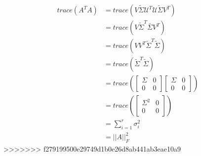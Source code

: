 \begin{align*}
trace(A^TA) &= trace(V\tilde{\Sigma}\mathcal{U}^T\mathcal{U}\tilde{\Sigma}V^T)\\
&= trace(V\tilde{\Sigma}^T\bar{\Sigma}V^T)\\
&= trace(VV^T\tilde{\Sigma}^T\tilde{\Sigma})\\
&= trace(\tilde{\Sigma}^T\tilde{\Sigma})\\
&= trace(
\begin{bmatrix}%
\Sigma & 0\\
0 & 0
\end{bmatrix}
\begin{bmatrix}%
\Sigma & 0\\
0 & 0
\end{bmatrix})\\
&= trace(
\begin{bmatrix}%
\Sigma^2 & 0\\
0 & 0
\end{bmatrix})\\
&= \sum^r_{i=1}\sigma_i^2 \\
&= ||A||^2_F
\end{align*}
>>>>>>> f279199500e29749d1b0e26d8ab441ab3eae10a9
